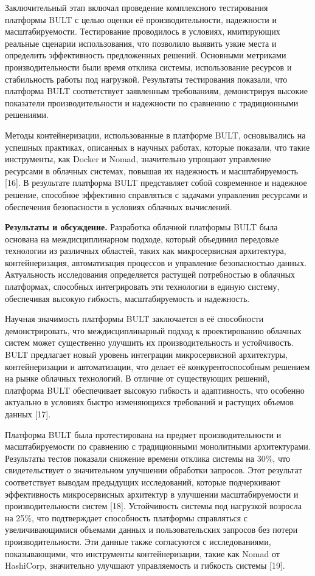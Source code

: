 {Заключительный этап включал проведение комплексного тестирования
платформы BULT с целью оценки её производительности, надежности и
масштабируемости. Тестирование проводилось в условиях, имитирующих
реальные сценарии использования, что позволило выявить узкие места и
определить эффективность предложенных решений. Основными метриками
производительности были время отклика системы, использование ресурсов и
стабильность работы под нагрузкой. Результаты тестирования показали, что
платформа BULT соответствует заявленным требованиям, демонстрируя
высокие показатели производительности и надежности по сравнению с
традиционными решениями.

Методы контейнеризации, использованные в платформе BULT, основывались на
успешных практиках, описанных в научных работах, которые показали, что
такие инструменты, как Docker и Nomad, значительно упрощают управление
ресурсами в облачных системах, повышая их надежность и масштабируемость
{[}16{]}. В результате платформа BULT представляет собой современное и
надежное решение, способное эффективно справляться с задачами управления
ресурсами и обеспечения безопасности в условиях облачных вычислений.

{\bfseries Результаты и обсуждение.} Разработка облачной платформы BULT
была основана на междисциплинарном подходе, который объединил передовые
технологии из различных областей, таких как микросервисная архитектура,
контейнеризация, автоматизация процессов и управление безопасностью
данных. Актуальность исследования определяется растущей потребностью в
облачных платформах, способных интегрировать эти технологии в единую
систему, обеспечивая высокую гибкость, масштабируемость и надежность.

Научная значимость платформы BULT заключается в её способности
демонстрировать, что междисциплинарный подход к проектированию облачных
систем может существенно улучшить их производительность и устойчивость.
BULT предлагает новый уровень интеграции микросервисной архитектуры,
контейнеризации и автоматизации, что делает её конкурентоспособным
решением на рынке облачных технологий. В отличие от существующих
решений, платформа BULT обеспечивает высокую гибкость и адаптивность,
что особенно актуально в условиях быстро изменяющихся требований и
растущих объемов данных {[}17{]}.

Платформа BULT была протестирована на предмет производительности и
масштабируемости по сравнению с традиционными монолитными архитектурами.
Результаты тестов показали снижение времени отклика системы на 30\%, что
свидетельствует о значительном улучшении обработки запросов. Этот
результат соответствует выводам предыдущих исследований, которые
подчеркивают эффективность микросервисных архитектур в улучшении
масштабируемости и производительности систем {[}18{]}. Устойчивость
системы под нагрузкой возросла на 25\%, что подтверждает способность
платформы справляться с увеличивающимися объемами данных и
пользовательских запросов без потери производительности. Эти данные
также согласуются с исследованиями, показывающими, что инструменты
контейнеризации, такие как Nomad от HashiCorp, значительно улучшают
управляемость и гибкость системы {[}19{]}.

}
